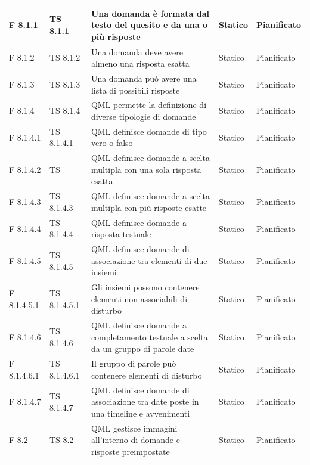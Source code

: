 \documentclass[a4paper,11pt]{article}
\begin{document}
\begin{longtable}{p{}p{}p{}p{}p{}}
\midrule
F 8.1.1 &TS 8.1.1&Una domanda è formata dal testo del quesito e da una o più risposte & Statico &Pianificato\\
\midrule
F 8.1.2 &TS 8.1.2&Una domanda deve avere almeno una risposta esatta & Statico &Pianificato\\
\midrule
F 8.1.3 & TS 8.1.3&Una domanda può avere una lista di possibili risposte & Statico &Pianificato\\
\midrule
F 8.1.4 & TS 8.1.4 &QML permette la definizione di diverse tipologie di domande & Statico &Pianificato\\
\midrule
F 8.1.4.1 &TS 8.1.4.1 &QML definisce domande di tipo vero o falso & Statico &Pianificato\\
\midrule
F 8.1.4.2 & TS&QML definisce domande a scelta multipla con una sola risposta esatta & Statico &Pianificato\\
\midrule
F 8.1.4.3 & TS 8.1.4.3 &QML definisce domande a scelta multipla con più risposte esatte & Statico &Pianificato\\
\midrule
F 8.1.4.4 & TS 8.1.4.4 &QML definisce domande a risposta testuale & Statico &Pianificato\\
\midrule
F 8.1.4.5 & TS 8.1.4.5 &QML definisce domande di associazione tra elementi di due insiemi & Statico &Pianificato\\
\midrule
F 8.1.4.5.1 &TS 8.1.4.5.1 &Gli insiemi possono contenere elementi non associabili di disturbo & Statico &Pianificato\\
\midrule
F 8.1.4.6 & TS 8.1.4.6&QML definisce domande a completamento testuale a scelta da un gruppo di parole date & Statico &Pianificato\\
\midrule
F 8.1.4.6.1 & TS 8.1.4.6.1 &Il gruppo di parole può contenere elementi di disturbo & Statico &Pianificato\\
\midrule
F 8.1.4.7 & TS 8.1.4.7&QML definisce domande di associazione tra date poste in una timeline e avvenimenti & Statico &Pianificato\\
\midrule
F 8.2 &TS 8.2 &QML gestisce immagini all'interno di domande e risposte preimpostate & Statico &Pianificato\\
\end{longtable}
\end{document}
